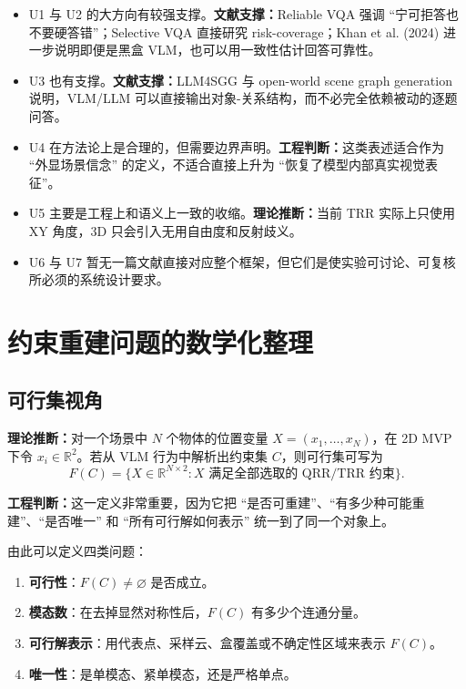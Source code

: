 \documentclass[11pt,a4paper]{ctexart}
\newcommand{\evidence}[1]{\textbf{文献支撑：}#1}
\newcommand{\engineering}[1]{\textbf{工程判断：}#1}
\newcommand{\theorynote}[1]{\textbf{理论推断：}#1}
\begin{document}
\begin{itemize}
  \item U1 与 U2 的大方向有较强支撑。\evidence{Reliable VQA 强调 ``宁可拒答也不要硬答错''；Selective VQA 直接研究 risk-coverage；Khan et al. (2024) 进一步说明即便是黑盒 VLM，也可以用一致性估计回答可靠性。}
  \item U3 也有支撑。\evidence{LLM4SGG 与 open-world scene graph generation 说明，VLM/LLM 可以直接输出对象-关系结构，而不必完全依赖被动的逐题问答。}
  \item U4 在方法论上是合理的，但需要边界声明。\engineering{这类表述适合作为 ``外显场景信念'' 的定义，不适合直接上升为 ``恢复了模型内部真实视觉表征''。}
  \item U5 主要是工程上和语义上一致的收缩。\theorynote{当前 TRR 实际上只使用 XY 角度，3D 只会引入无用自由度和反射歧义。}
  \item U6 与 U7 暂无一篇文献直接对应整个框架，但它们是使实验可讨论、可复核所必须的系统设计要求。
\end{itemize}

\section{约束重建问题的数学化整理}

\subsection{可行集视角}

\theorynote{对一个场景中 $N$ 个物体的位置变量 $X = (x_1,\dots,x_N)$，在 2D MVP 下令 $x_i \in \mathbb{R}^2$。若从 VLM 行为中解析出约束集 $C$，则可行集可写为}
\[
F(C) = \{ X \in \mathbb{R}^{N \times 2} : X \text{ 满足全部选取的 QRR/TRR 约束} \}.
\]

\engineering{这一定义非常重要，因为它把 ``是否可重建''、``有多少种可能重建''、``是否唯一'' 和 ``所有可行解如何表示'' 统一到了同一个对象上。}

由此可以定义四类问题：
\begin{enumerate}[label=\arabic*.]
  \item \textbf{可行性}：$F(C) \neq \varnothing$ 是否成立。
  \item \textbf{模态数}：在去掉显然对称性后，$F(C)$ 有多少个连通分量。
  \item \textbf{可行解表示}：用代表点、采样云、盒覆盖或不确定性区域来表示 $F(C)$。
  \item \textbf{唯一性}：是单模态、紧单模态，还是严格单点。
\end{enumerate}
\end{document}
